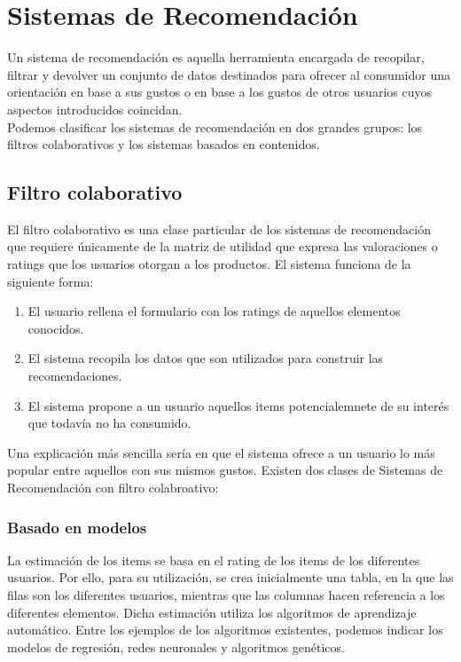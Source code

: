\section{Sistemas de Recomendación}
Un sistema de recomendación es aquella herramienta encargada de recopilar, filtrar y devolver un conjunto de datos destinados para ofrecer al consumidor una orientación en base a sus gustos o en base a los gustos de otros usuarios cuyos aspectos introducidos coincidan.\nocite{wiki:recomendacion} \\
Podemos clasificar los sistemas de recomendación en dos grandes grupos: los filtros colaborativos y los sistemas basados en contenidos.
\subsection{Filtro colaborativo}
El filtro colaborativo es una clase particular de los sistemas de recomendación que requiere únicamente de la matriz de utilidad que expresa las valoraciones o ratings que los usuarios otorgan a los productos. El sistema funciona de la siguiente forma: \nocite{andres_gonzalez_sistemas_2014}
\begin{enumerate}
\item El usuario rellena el formulario con los ratings de aquellos elementos conocidos.
\item El sistema recopila los datos que son utilizados para construir las recomendaciones. \nocite{upf:recomendacion}
\item El sistema propone a un usuario aquellos items potencialemnete de su interés que todavía no ha consumido. \cite{wiki:filtrado}
\end{enumerate}
Una explicación más sencilla sería en que el sistema ofrece a un usuario lo más popular entre aquellos con sus mismos gustos.\nocite{ucm:recomendacion} 
Existen dos clases de Sistemas de Recomendación con filtro colabroativo: 
\subsubsection{Basado en modelos}
La estimación de los items se basa en el rating de los items de los diferentes usuarios. 
Por ello, para su utilización, se crea inicialmente una tabla, en la que las filas son los diferentes usuarios, mientras que las columnas hacen referencia a los diferentes elementos.
Dicha estimación utiliza los algoritmos de aprendizaje automático. Entre los ejemplos de los algoritmos existentes, podemos indicar los modelos de regresión, redes neuronales y algoritmos genéticos.\nocite{wiki:filtrado} 



